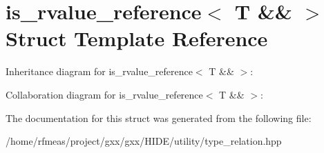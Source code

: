 \hypertarget{structis__rvalue__reference_3_01T_01_6_6_01_4}{}\section{is\+\_\+rvalue\+\_\+reference$<$ T \&\& $>$ Struct Template Reference}
\label{structis__rvalue__reference_3_01T_01_6_6_01_4}


Inheritance diagram for is\+\_\+rvalue\+\_\+reference$<$ T \&\& $>$\+:


Collaboration diagram for is\+\_\+rvalue\+\_\+reference$<$ T \&\& $>$\+:


The documentation for this struct was generated from the following file\+:\begin{DoxyCompactItemize}
\item 
/home/rfmeas/project/gxx/gxx/\+H\+I\+D\+E/utility/type\+\_\+relation.\+hpp\end{DoxyCompactItemize}
